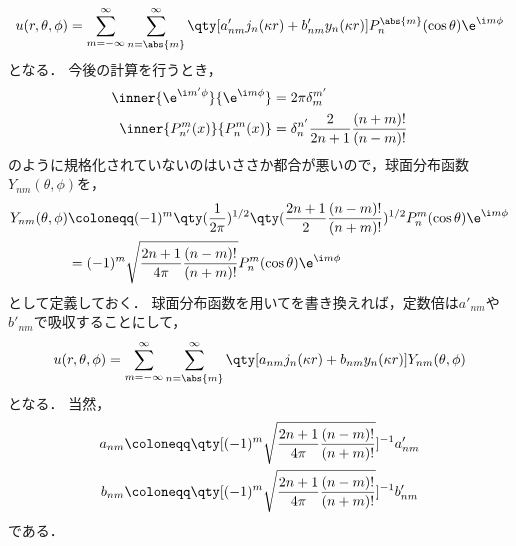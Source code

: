 \documentclass{report}
\begin{document}
      \begin{align}
        u(r, \theta, \phi) = \sum_{m = -\infty}^{\infty}\sum_{n = \abs{m}}^{\infty}\qty[a'_{nm}j_n(\kappa r) + b'_{nm}y_n(\kappa r)] P_{n}^{\abs{m}}(\cos\theta)\e^{\i m\phi} \label{u-expand-form1}
      \end{align}
      となる．
      今後の計算を行うとき，
      \begin{align}
        \inner{\e^{\i m'\phi}}{\e^{\i m\phi}} &= 2\pi\delta_m^{m'} \\ 
        \inner{P_{n'}^m(x)}{P_n^m(x)} &= \delta_{n}^{n'}\frac{2}{2n + 1}\frac{(n + m)!}{(n - m)!}
      \end{align}
      のように規格化されていないのはいささか都合が悪いので，球面分布函数$Y_{nm}(\theta, \phi)$を，
      \begin{align}
        Y_{nm}(\theta, \phi) &\coloneqq (-1)^m\qty(\frac{1}{2\pi})^{1/2}\qty(\frac{2n + 1}{2}\frac{(n - m)!}{(n + m)!})^{1/2}P_n^m(\cos\theta)\e^{\i m\phi} \\ 
        &= (-1)^m\sqrt{\frac{2n + 1}{4\pi}\frac{(n - m)!}{(n + m)!}}P_n^m(\cos\theta)\e^{\i m\phi}
      \end{align}
      として定義しておく．
      球面分布函数を用いてを書き換えれば，定数倍は$a'_{nm}$や$b'_{nm}$で吸収することにして，
      \begin{align}
        u(r, \theta, \phi) = \sum_{m = -\infty}^{\infty}\sum_{n = \abs{m}}^{\infty}\qty[a_{nm}j_n(\kappa r) + b_{nm}y_n(\kappa r)]Y_{nm}(\theta, \phi)\label{u-expand-form2}
      \end{align}
      となる．
      当然，
      \begin{align}
        a_{nm} &\coloneqq \qty[(-1)^m\sqrt{\frac{2n + 1}{4\pi}\frac{(n - m)!}{(n + m)!}}]^{-1}a'_{nm} \\ 
        b_{nm} &\coloneqq \qty[(-1)^m\sqrt{\frac{2n + 1}{4\pi}\frac{(n - m)!}{(n + m)!}}]^{-1}b'_{nm}
      \end{align}
      である．
    
\end{document}

